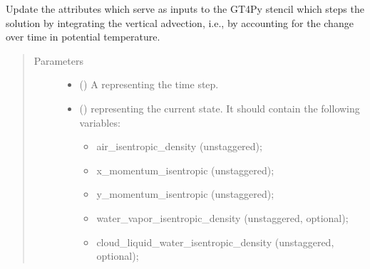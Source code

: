 \documentclass[letterpaper,10pt,english]{sphinxmanual}
\begin{document}
\begin{fulllineitems}
\begin{fulllineitems}
\begin{quote}
\begin{description}
\begin{itemize}
\end{itemize}


\end{description}\end{quote}

\end{fulllineitems}


\begin{fulllineitems}
\label{\detokenize{api:tasmania.dycore.prognostic_isentropic.PrognosticIsentropic._stencil_stepping_by_coupling_physics_with_dynamics_set_inputs}}
Update the attributes which serve as inputs to the GT4Py stencil which steps the solution
by integrating the vertical advection, i.e., by accounting for the change over time in potential temperature.
\begin{quote}\begin{description}
\item[{Parameters}] \leavevmode\begin{itemize}
\item {} 
 () \textendash{} A  representing the time step.

\item {} 
 () \textendash{} 
{\hyperref[\detokenize{api:tasmania.storages.state_isentropic.StateIsentropic}]{}} representing the current state.
It should contain the following variables:
\begin{itemize}
\item {} 
air\_isentropic\_density (unstaggered);

\item {} 
x\_momentum\_isentropic (unstaggered);

\item {} 
y\_momentum\_isentropic (unstaggered);

\item {} 
water\_vapor\_isentropic\_density (unstaggered, optional);

\item {} 
cloud\_liquid\_water\_isentropic\_density (unstaggered, optional);


\end{itemize}
\end{itemize}
\end{description}
\end{quote}
\end{fulllineitems}
\end{fulllineitems}
\end{document}
